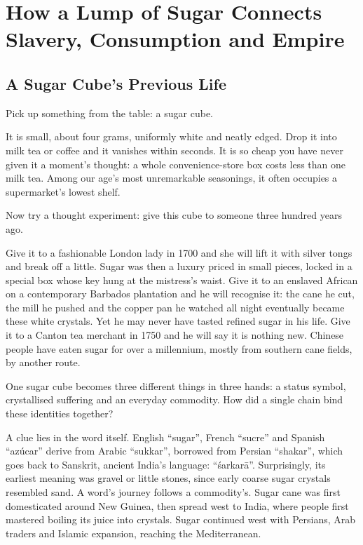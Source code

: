 \chapter[Sugar, Slavery and Empire]{How a Lump of Sugar Connects Slavery, Consumption and Empire}
\section{A Sugar Cube's Previous Life}
Pick up something from the table: a sugar cube.

It is small, about four grams, uniformly white and neatly edged. Drop it into milk tea or coffee and it vanishes within seconds. It is so cheap you have never given it a moment's thought: a whole convenience-store box costs less than one milk tea. Among our age's most unremarkable seasonings, it often occupies a supermarket's lowest shelf.

Now try a thought experiment: give this cube to someone three hundred years ago.

Give it to a fashionable London lady in 1700 and she will lift it with silver tongs and break off a little. Sugar was then a luxury priced in small pieces, locked in a special box whose key hung at the mistress's waist. Give it to an enslaved African on a contemporary Barbados plantation and he will recognise it: the cane he cut, the mill he pushed and the copper pan he watched all night eventually became these white crystals. Yet he may never have tasted refined sugar in his life. Give it to a Canton tea merchant in 1750 and he will say it is nothing new. Chinese people have eaten sugar for over a millennium, mostly from southern cane fields, by another route.

One sugar cube becomes three different things in three hands: a status symbol, crystallised suffering and an everyday commodity. How did a single chain bind these identities together?

A clue lies in the word itself. English ``sugar'', French ``sucre'' and Spanish ``azúcar'' derive from Arabic ``sukkar'', borrowed from Persian ``shakar'', which goes back to Sanskrit, ancient India's language: ``śarkarā''. Surprisingly, its earliest meaning was gravel or little stones, since early coarse sugar crystals resembled sand. A word's journey follows a commodity's. Sugar cane was first domesticated around New Guinea, then spread west to India, where people first mastered boiling its juice into crystals. Sugar continued west with Persians, Arab traders and Islamic expansion, reaching the Mediterranean.

